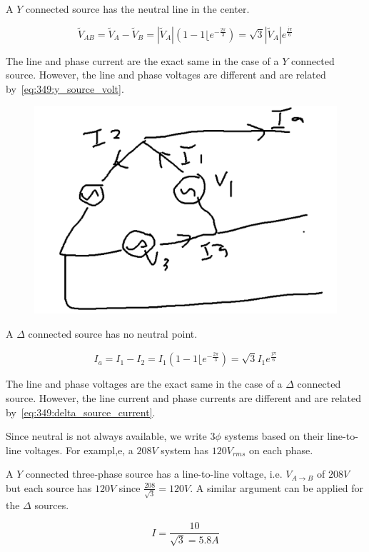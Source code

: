 \documentclass[../notes.tex]{subfiles}
\begin{document}
A $ Y $ connected source has the neutral line in the center.


\begin{equation}
	\tilde{V}_{AB} = \tilde{V}_A - \tilde{V}_B = |\tilde{V}_A| (1-1\lfloor e^{-\frac{2\pi}{3}}) = \sqrt{3}  |\tilde{V}_A| e^{ \frac{j\pi}{6}}
	\label{eq:349:y_source_volt}
\end{equation}

The line and phase current are the exact same in the case of a $ Y $ connected source.
However, the line and phase voltages are different and are related by~\eqref{eq:349:y_source_volt}.


\begin{figure}[H]
	\centering
	\includegraphics[width=0.8\linewidth]{img/image_2022-09-19-11-42-03.png}
\end{figure}


A $ \Delta $  connected source has no neutral point.

\begin{equation}
	I_a = I_1 - I_2 = I_1 (1- 1 \lfloor e^{-\frac{2\pi}{3}}) = \sqrt{3} I_1 e^{\frac{j\pi}{6}}
	\label{eq:349:delta_source_current}
\end{equation}

The line and phase voltages are the exact same in the case of a $ \Delta $ connected source.
However, the line current and phase currents are different and are related by~\eqref{eq:349:delta_source_current}.




Since neutral is not always available, we write $ 3\phi $ systems based on their line-to-line voltages.
For exampl,e, a $ 208V $ system has $ 120V_{rms} $ on each phase.


\begin{example}
	A $ Y $ connected three-phase source has a line-to-line voltage, i.e. $ V_{A \rightarrow B} $ of $ 208V$ but each source has $ 120V $ since $ \frac{208}{\sqrt{3} } = 120V $.
	A similar argument can be applied for the $ \Delta $ sources.

	\begin{equation}
		I = \frac{10}{\sqrt{3}  = 5.8A}
	\end{equation}
	
\end{example}
\end{document}
